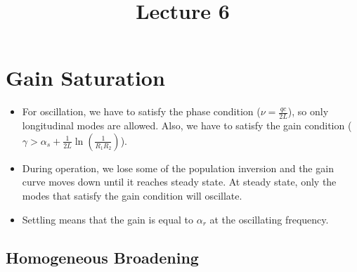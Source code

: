 \documentclass[11pt]{article}
\title{Lecture 6}
\author{}
\date{}
\begin{document}
\maketitle

\section{Gain Saturation}
\begin{itemize}
    \item For oscillation, we have to satisfy the phase condition ($\nu = \frac{qc}{2L}$), so only longitudinal modes are allowed. Also, we have to satisfy the gain condition ($\gamma > \alpha_s + \frac{1}{2L} \ln \left( \frac{1}{R_1 R_2} \right)$).
    \item During operation, we lose some of the population inversion and the gain curve moves down until it reaches steady state. At steady state, only the modes that satisfy the gain condition will oscillate.
    \item Settling means that the gain is equal to $\alpha_r$ at the oscillating frequency.
\end{itemize}

\subsection{Homogeneous Broadening}
\end{document}
